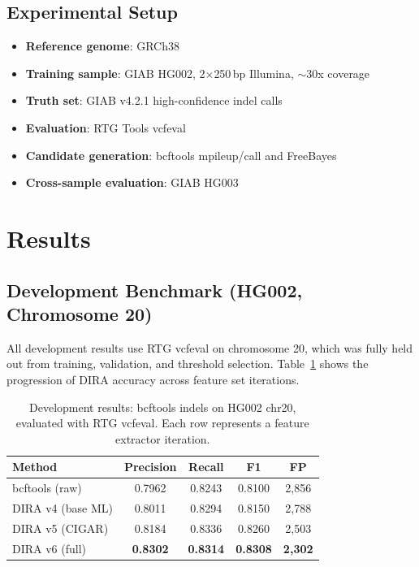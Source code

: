 \documentclass[sigconf]{acmart}
\begin{document}
\subsection{Experimental Setup}
\begin{itemize}
    \item \textbf{Reference genome}: GRCh38
    \item \textbf{Training sample}: GIAB HG002, 2$\times$250\,bp Illumina, $\sim$30x coverage
    \item \textbf{Truth set}: GIAB v4.2.1 high-confidence indel calls~\cite{zook2019open, wagner2022benchmarking}
    \item \textbf{Evaluation}: RTG Tools vcfeval~\cite{krusche2019best}
    \item \textbf{Candidate generation}: bcftools mpileup/call and FreeBayes
    \item \textbf{Cross-sample evaluation}: GIAB HG003
\end{itemize}

\section{Results}

\subsection{Development Benchmark (HG002, Chromosome 20)}
All development results use RTG vcfeval on chromosome 20, which was fully held out from training, validation, and threshold selection. Table~\ref{tab:dev} shows the progression of DIRA accuracy across feature set iterations.

\begin{table}[h]
\caption{Development results: bcftools indels on HG002 chr20, evaluated with RTG vcfeval. Each row represents a feature extractor iteration.}
\label{tab:dev}
\begin{tabular}{lcccc}
\toprule
\textbf{Method} & \textbf{Precision} & \textbf{Recall} & \textbf{F1} & \textbf{FP} \\
\midrule
bcftools (raw) & 0.7962 & 0.8243 & 0.8100 & 2{,}856 \\
DIRA v4 (base ML) & 0.8011 & 0.8294 & 0.8150 & 2{,}788 \\
DIRA v5 (CIGAR) & 0.8184 & 0.8336 & 0.8260 & 2{,}503 \\
DIRA v6 (full) & \textbf{0.8302} & \textbf{0.8314} & \textbf{0.8308} & \textbf{2{,}302} \\
\bottomrule
\end{tabular}
\end{table}
\end{document}
